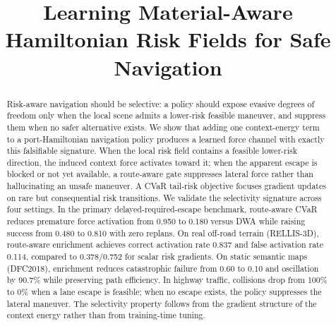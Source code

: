 \documentclass{article}
\title{Learning Material-Aware Hamiltonian Risk Fields for Safe Navigation}
\author{%
}
\theoremstyle{definition}
\begin{document}
\maketitle


\begin{abstract}
Risk-aware navigation should be selective: a policy should expose evasive degrees of freedom only when the local scene admits a lower-risk feasible maneuver, and suppress them when no safer alternative exists. We show that adding one context-energy term to a port-Hamiltonian navigation policy produces a learned force channel with exactly this falsifiable signature. When the local risk field contains a feasible lower-risk direction, the induced context force activates toward it; when the apparent escape is blocked or not yet available, a route-aware gate suppresses lateral force rather than hallucinating an unsafe maneuver. A CVaR tail-risk objective focuses gradient updates on rare but consequential risk transitions. We validate the selectivity signature across four settings. In the primary delayed-required-escape benchmark, route-aware CVaR reduces premature force activation from 0.950 to 0.180 versus DWA while raising success from 0.480 to 0.810 with zero replans. On real off-road terrain (RELLIS-3D), route-aware enrichment achieves correct activation rate 0.837 and false activation rate 0.114, compared to 0.378/0.752 for scalar risk gradients. On static semantic maps (DFC2018), enrichment reduces catastrophic failure from 0.60 to 0.10 and oscillation by 90.7\% while preserving path efficiency. In highway traffic, collisions drop from 100\% to 0\% when a lane escape is feasible; when no escape exists, the policy suppresses the lateral maneuver. The selectivity property follows from the gradient structure of the context energy rather than from training-time tuning.

\end{abstract}
\end{document}
